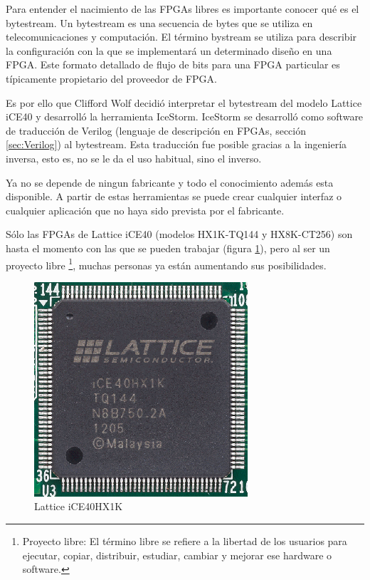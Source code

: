 Para entender el nacimiento de las FPGAs libres es importante conocer qué es el bytestream. \newline
Un bytestream es una secuencia de bytes que se utiliza en telecomunicaciones y computación. El término bystream se utiliza para describir la configuración con la que se implementará un determinado diseño en una FPGA. Este formato detallado de flujo de bits para una FPGA particular es típicamente propietario del proveedor de FPGA. \newline

Es por ello que Clifford Wolf decidió interpretar el bytestream del modelo Lattice iCE40 y desarrolló la herramienta IceStorm. \newline
IceStorm se desarrolló como software de traducción de Verilog (lenguaje de descripción en FPGAs, sección \ref{sec:Verilog}) al bytestream. Esta traducción fue posible gracias a la ingeniería inversa, esto es, no se le da el uso habitual, sino el inverso. 

Ya no se depende de ningun fabricante y todo el conocimiento además esta disponible. A partir de estas herramientas se puede crear cualquier interfaz o cualquier aplicación que no haya sido prevista por el fabricante. \newline

Sólo las FPGAs de Lattice iCE40 (modelos HX1K-TQ144 y HX8K-CT256) son hasta el momento con las que se pueden trabajar (figura \ref{fig:lattice}), pero al ser un proyecto libre \footnote{Proyecto libre: El término libre se refiere a la libertad de los usuarios para ejecutar, copiar, distribuir, estudiar, cambiar y mejorar ese hardware o software.}, muchas personas ya están aumentando sus posibilidades.
\begin{center}
	\begin{figure}[H]
		\center
		\includegraphics[trim = 0mm 0mm 0mm 0mm, clip,scale=0.4]{imagenes/EstadoArte/lattice.png}
		\caption{Lattice iCE40HX1K}
		\label{fig:lattice}
	\end{figure}
\end{center}

